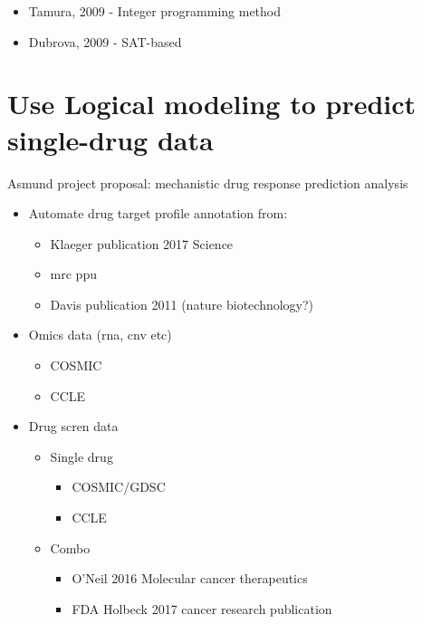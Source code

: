 \documentclass[12pt,]{book}
\providecommand{\tightlist}{%
  \setlength{\itemsep}{0pt}\setlength{\parskip}{0pt}}
\theoremstyle{definition}
\theoremstyle{definition}
\theoremstyle{definition}
\theoremstyle{remark}
\begin{document}
\begin{itemize}
\tightlist
\item
  Tamura, 2009 - Integer programming method
\item
  Dubrova, 2009 - SAT-based
\end{itemize}

\hypertarget{use-logical-modeling-to-predict-single-drug-data}{%
\section{Use Logical modeling to predict single-drug data}\label{use-logical-modeling-to-predict-single-drug-data}}

Asmund project proposal: mechanistic drug response prediction analysis

\begin{itemize}
\tightlist
\item
  Automate drug target profile annotation from:

  \begin{itemize}
  \tightlist
  \item
    Klaeger publication 2017 Science
  \item
    mrc ppu
  \item
    Davis publication 2011 (nature biotechnology?)
  \end{itemize}
\item
  Omics data (rna, cnv etc)

  \begin{itemize}
  \tightlist
  \item
    COSMIC
  \item
    CCLE
  \end{itemize}
\item
  Drug scren data

  \begin{itemize}
  \tightlist
  \item
    Single drug

    \begin{itemize}
    \tightlist
    \item
      COSMIC/GDSC
    \item
      CCLE
    \end{itemize}
  \item
    Combo

    \begin{itemize}
    \tightlist
    \item
      O'Neil 2016 Molecular cancer therapeutics
    \item
      FDA Holbeck 2017 cancer research publication
    \end{itemize}
  \end{itemize}
\end{itemize}
\end{document}
